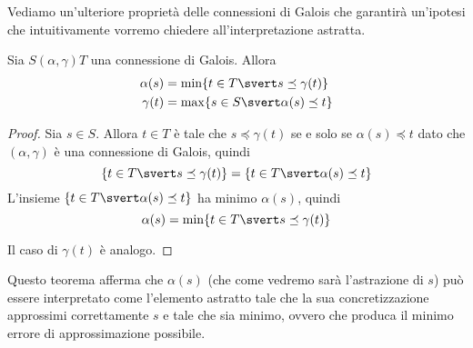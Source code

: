 \documentclass[12pt]{article}
\numberwithin{theorem}{subsection}
\begin{document}
Vediamo un'ulteriore proprietà delle connessioni di Galois che garantirà un'ipotesi che intuitivamente vorremo chiedere all'interpretazione astratta.
\begin{prop}\label{th:galois-conn-best-approx}
	Sia $S (\alpha, \gamma) T$ una connessione di Galois.
	Allora
	\begin{align*}
	\alpha(s) &= \min \{ t \in T \svert s \preceq \gamma(t) \} \\
	\gamma(t) &= \max \{ s \in S \svert \alpha(s) \preceq t \}
	\end{align*}
\end{prop}
\begin{proof}
	Sia $s \in S$. Allora $t \in T$ è tale che $s \preceq \gamma(t)$ se e solo se $\alpha(s) \preceq t$ dato che $(\alpha, \gamma)$ è una connessione di Galois, quindi
	\[
	\{ t \in T \svert s \preceq \gamma(t) \} = \{ t \in T \svert \alpha(s) \preceq t \}
	\]
	L'insieme $\{ t \in T \svert \alpha(s) \preceq t \}$ ha minimo $\alpha(s)$, quindi
	\[
	\alpha(s) = \min \{ t \in T \svert s \preceq \gamma(t) \}
	\]
	
	Il caso di $\gamma(t)$ è analogo.
\end{proof}

Questo teorema afferma che $\alpha(s)$ (che come vedremo sarà l'astrazione di $s$) può essere interpretato come l'elemento astratto tale che la sua concretizzazione approssimi correttamente $s$ e tale che sia minimo, ovvero che produca il minimo errore di approssimazione possibile.
\end{document}
